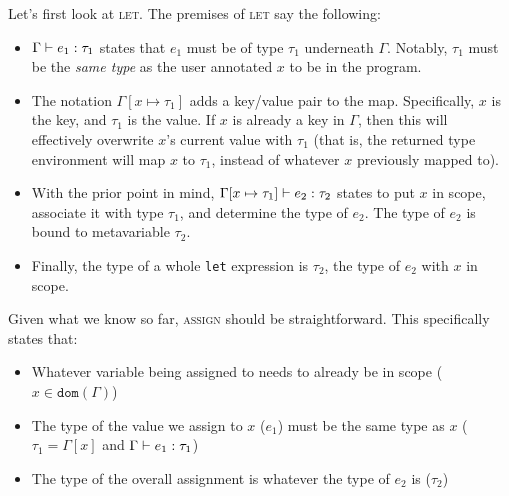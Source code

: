 Let's first look at \textsc{let}.
The premises of \textsc{let} say the following:
\begin{itemize}
\item $\typeof{e_1}{\Gamma}{\tau_1}$ states that $e_1$ must be of type $\tau_1$ underneath $\Gamma$.
  Notably, $\tau_1$ must be the \emph{same type} as the user annotated $x$ to be in the program.
\item The notation $\Gamma[x \mapsto \tau_1]$ adds a key/value pair to the map.
  Specifically, $x$ is the key, and $\tau_1$ is the value.
  If $x$ is already a key in $\Gamma$, then this will effectively overwrite $x$'s current value with $\tau_1$ (that is, the returned type environment will map $x$ to $\tau_1$, instead of whatever $x$ previously mapped to).
\item With the prior point in mind, $\typeof{e_2}{\Gamma[x \mapsto \tau_1]}{\tau_2}$ states to put $x$ in scope, associate it with type $\tau_1$, and determine the type of $e_2$.
  The type of $e_2$ is bound to metavariable $\tau_2$.
\item Finally, the type of a whole \texttt{let} expression is $\tau_2$, the type of $e_2$ with $x$ in scope.
\end{itemize}

Given what we know so far, \textsc{assign} should be straightforward.
This specifically states that:
\begin{itemize}
\item Whatever variable being assigned to needs to already be in scope ($x \in \texttt{dom}(\Gamma)$)
\item The type of the value we assign to $x$ ($e_1$) must be the same type as $x$ ($\tau_1 = \Gamma[x]$ and $\typeof{e_1}{\Gamma}{\tau_1}$)
\item The type of the overall assignment is whatever the type of $e_2$ is ($\tau_2$)
\end{itemize}
